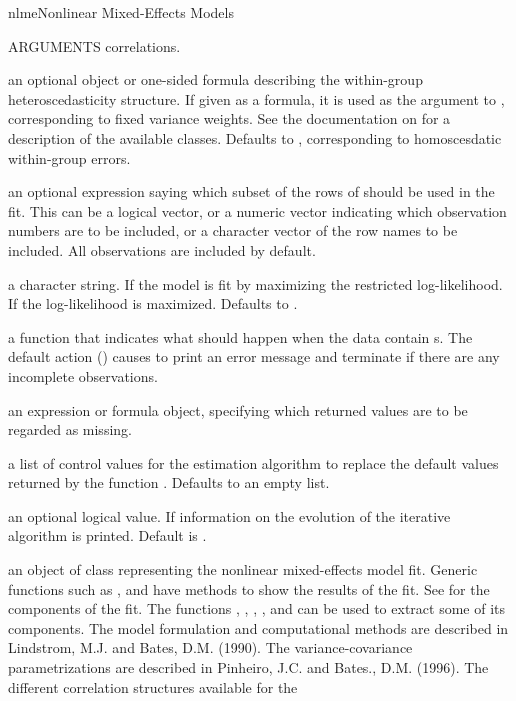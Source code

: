 \documentclass[pdftex]{article} \usepackage{url,graphicx}
\begin{document}
\begin{Helpfile}{nlme}{Nonlinear Mixed-Effects Models}
\begin{Argument}{ARGUMENTS}
correlations.
\item[\Co{weights:}]
an optional  object or one-sided formula
describing the within-group heteroscedasticity structure. If given as
a formula, it is used as the argument to ,
corresponding to fixed variance weights. See the documentation on
 for a description of the available 
classes. Defaults to , corresponding to homoscesdatic
within-group errors.
\item[\Co{subset:}]
an optional expression saying which subset of the rows of
 should  be  used in the fit. This can be a logical
vector, or a numeric vector indicating which observation numbers are
to be included, or a  character  vector of the row names to be
included.  All observations are included by default.
\item[\Co{method:}]
a character string.  If  the model is fit by
maximizing the restricted log-likelihood.  If  the
log-likelihood is maximized.  Defaults to .
\item[\Co{na.action:}]
a function that indicates what should happen when the
data contain s.  The default action () causes
 to print an error message and terminate if there are any
incomplete observations.
\item[\Co{naPattern:}]
an expression or formula object, specifying which returned
values are to be regarded as missing.
\item[\Co{control:}]
a list of control values for the estimation algorithm to
replace the default values returned by the function .
Defaults to an empty list.
\item[\Co{verbose:}]
an optional logical value. If  information on
the evolution of the iterative algorithm is printed. Default is
.
\end{Argument}
an object of class  representing the nonlinear
mixed-effects model fit. Generic functions such as ,
 and  have methods to show the results of the
fit. See  for the components of the fit. The functions
, , , , and
  can be used to extract some of its components.
The model formulation and computational methods are described in
Lindstrom, M.J. and Bates, D.M. (1990). The variance-covariance
parametrizations are described in Pinheiro, J.C. and Bates., D.M.
(1996).   The different correlation structures available for the

\end{Helpfile}
\end{document}
